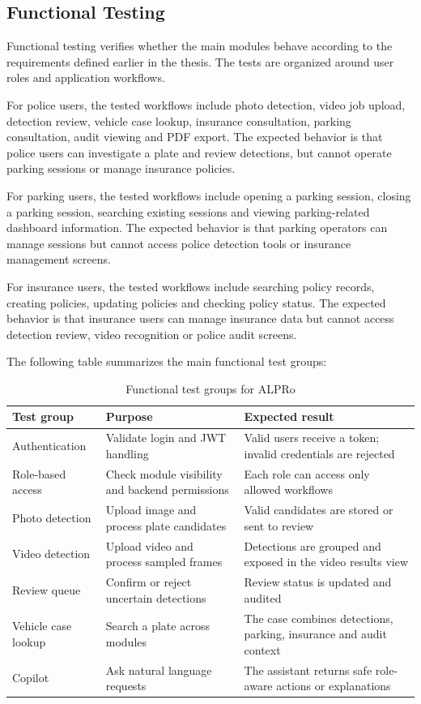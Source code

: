 ﻿\documentclass[12pt,a4paper]{article}
\begin{document}
\subsection{Functional Testing}

Functional testing verifies whether the main modules behave according to the requirements defined earlier in the thesis. The tests are organized around user roles and application workflows.

For police users, the tested workflows include photo detection, video job upload, detection review, vehicle case lookup, insurance consultation, parking consultation, audit viewing and PDF export. The expected behavior is that police users can investigate a plate and review detections, but cannot operate parking sessions or manage insurance policies.

For parking users, the tested workflows include opening a parking session, closing a parking session, searching existing sessions and viewing parking-related dashboard information. The expected behavior is that parking operators can manage sessions but cannot access police detection tools or insurance management screens.

For insurance users, the tested workflows include searching policy records, creating policies, updating policies and checking policy status. The expected behavior is that insurance users can manage insurance data but cannot access detection review, video recognition or police audit screens.

The following table summarizes the main functional test groups:

\begin{table}[H]
\centering
\begin{tabular}{|p{4cm}|p{6cm}|p{4cm}|}
\hline
\textbf{Test group} & \textbf{Purpose} & \textbf{Expected result} \\
\hline
Authentication & Validate login and JWT handling & Valid users receive a token; invalid credentials are rejected \\
\hline
Role-based access & Check module visibility and backend permissions & Each role can access only allowed workflows \\
\hline
Photo detection & Upload image and process plate candidates & Valid candidates are stored or sent to review \\
\hline
Video detection & Upload video and process sampled frames & Detections are grouped and exposed in the video results view \\
\hline
Review queue & Confirm or reject uncertain detections & Review status is updated and audited \\
\hline
Vehicle case lookup & Search a plate across modules & The case combines detections, parking, insurance and audit context \\
\hline
Copilot & Ask natural language requests & The assistant returns safe role-aware actions or explanations \\
\hline
\end{tabular}
\caption{Functional test groups for ALPRo}
\end{table}
\end{document}
